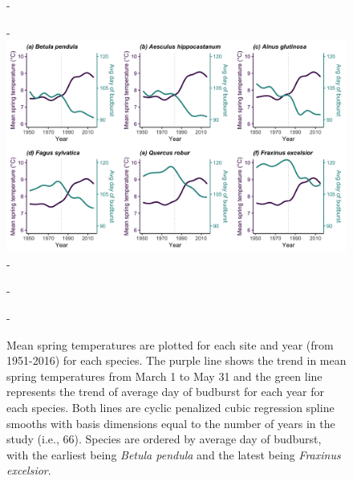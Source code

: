 \documentclass{article}\usepackage[]{graphicx}\usepackage[]{color}
\begin{document}
{\begin{figure} [H]
  -\begin{center}
  -\includegraphics[width=16cm]{..//..//analyses/figures/mstbb_byspp_lines.png}
  -\caption{Mean spring temperatures are plotted for each site and year (from 1951-2016) for each species. The purple line shows the trend in mean spring temperatures from March 1 to May 31 and the green line represents the trend of average day of budburst for each year for each species. Both lines are cyclic penalized cubic regression spline smooths with basis dimensions equal to the number of years in the study (i.e., 66). Species are ordered by average day of budburst, with the earliest being \textit{Betula pendula} and the latest being \textit{Fraxinus excelsior}. }\label{fig:mst}
  -\end{center}
  -\end{figure}}
  
\end{document}
